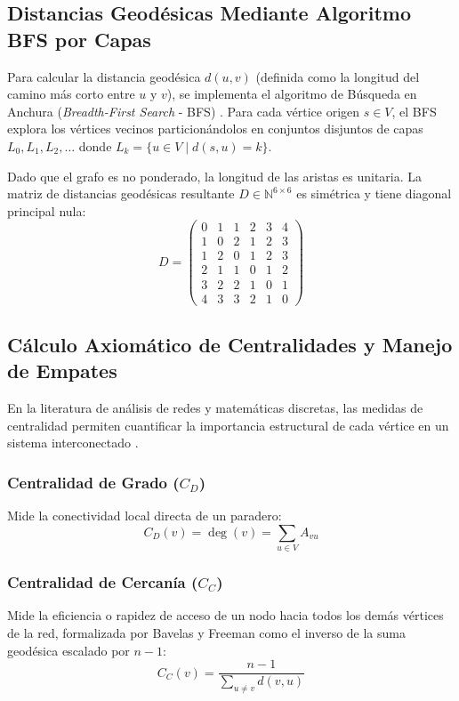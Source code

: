 \documentclass[11pt,letterpaper]{article}
\begin{document}
\subsection{Distancias Geodésicas Mediante Algoritmo BFS por Capas}

Para calcular la distancia geodésica $d(u, v)$ (definida como la longitud del camino más corto entre $u$ y $v$), se implementa el algoritmo de Búsqueda en Anchura (\textit{Breadth-First Search} - BFS) \cite{cormen2009}. Para cada vértice origen $s \in V$, el BFS explora los vértices vecinos particionándolos en conjuntos disjuntos de capas $L_0, L_1, L_2, \dots$ donde $L_k = \{u \in V \mid d(s, u) = k\}$. 

Dado que el grafo es no ponderado, la longitud de las aristas es unitaria. La matriz de distancias geodésicas resultante $D \in \mathbb{N}^{6 \times 6}$ es simétrica y tiene diagonal principal nula:
\begin{equation}
D = \begin{pmatrix}
0 & 1 & 1 & 2 & 3 & 4 \\
1 & 0 & 2 & 1 & 2 & 3 \\
1 & 2 & 0 & 1 & 2 & 3 \\
2 & 1 & 1 & 0 & 1 & 2 \\
3 & 2 & 2 & 1 & 0 & 1 \\
4 & 3 & 3 & 2 & 1 & 0
\end{pmatrix}
\end{equation}

\subsection{Cálculo Axiomático de Centralidades y Manejo de Empates}

En la literatura de análisis de redes y matemáticas discretas, las medidas de centralidad permiten cuantificar la importancia estructural de cada vértice en un sistema interconectado \cite{west2001,freeman1977}.

\subsubsection{Centralidad de Grado ($C_D$)}
Mide la conectividad local directa de un paradero:
\begin{equation}
C_D(v) = \deg(v) = \sum_{u \in V} A_{vu}
\end{equation}

\subsubsection{Centralidad de Cercanía ($C_C$)}
Mide la eficiencia o rapidez de acceso de un nodo hacia todos los demás vértices de la red, formalizada por Bavelas y Freeman como el inverso de la suma geodésica escalado por $n-1$:
\begin{equation}
C_C(v) = \frac{n - 1}{\sum_{u \neq v} d(v, u)}
\end{equation}
\end{document}
